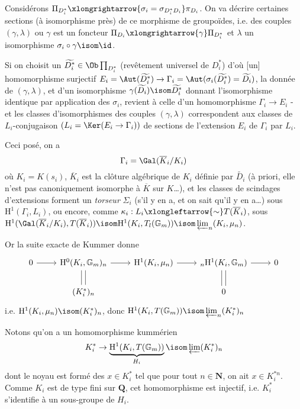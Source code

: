 Considérons $\Pi_{D^*_i} \xlongrightarrow{\sigma_i = \sigma_{D^*_i D_i}} \pi_{D_i}$. On va décrire certaines sections (à isomorphisme près) de ce morphisme de groupoïdes, i.e. des couples $(\gamma, \lambda)$ ou $\gamma$ est un foncteur $\Pi_{D_i} \xlongrightarrow{\gamma} \Pi_{D^*_i}$ et $\lambda$ un isomorphisme $\sigma_i \circ \gamma \isom \id$.

Si on choisit un $\widetilde{D^*_i} \in \Ob \prod_{D^*_i}$ (revêtement universel de $D^*_i$) d'où [un] homomorphisme surjectif $E_i = \Aut(\widetilde{D^*_i}) \to \Gamma_i = \Aut(\sigma_i (\widetilde{D^*_i}) = \widetilde{D_i})$, la donnée de $(\gamma, \lambda)$, et d'un isomorphisme $\gamma(\widetilde{D_i}) \isom \widetilde{D^*_i}$ donnant l'isomorphisme identique par application des $\sigma_i$, revient à celle d'un homomorphisme $\Gamma_i \to E_i$ - et les classes d'isomorphismes des couples $(\gamma, \lambda)$ correspondent aux classes de $L_i$-conjugaison $(L_i = \Ker(E_i \to \Gamma_i))$ de sections de l'extension $E_i$ de $\Gamma_i$ par $L_i$.

Ceci posé, on a 
$$
\Gamma_i = \Gal(\overline{K}_i/K_i)
$$
où $K_i = K(s_i)$, $\overline{K}_i$ est la clôture algébrique de $K_i$ définie par $\widetilde{D_i}$ (à priori, elle n'est pas canoniquement isomorphe à $\overline{K}$ sur $K$\dots), et les classes de scindages d'extensions forment un \emph{torseur} $\Sigma_i$ (s'il y en a, et on sait qu'il y en a\dots) sous $\mathrm{H}^1(\Gamma_i, L_i)$, ou encore, comme $\kappa_i: L_i \xlongleftarrow{\sim} T(\overline{K}_i)$, sous $\mathrm{H}^1(\Gal(\overline{K}_i/K_i), T(\overline{K}_i)) \isom \mathrm{H}^1(K_i, T_l(\mathbb{G}_m)) \isom \varprojlim_n (K_i, \mu_n)$.

Or la suite exacte de Kummer donne
\[\begin{tikzcd}
	0 & {\mathrm{H}^0(K_i, \mathbb{G}_m)_n} & {\mathrm{H}^1(K_i, \mu_n)} & {_n \mathrm{H}^1(K_i, \mathbb{G}_m)} & 0 \\
	& {(K^*_i)_n} && 0
	\arrow[shift left=1, no head, from=1-2, to=2-2]
	\arrow[shift right=1, no head, from=1-2, to=2-2]
	\arrow[shift left=1, no head, from=1-4, to=2-4]
	\arrow[shift right=1, no head, from=1-4, to=2-4]
	\arrow[from=1-2, to=1-3]
	\arrow[from=1-3, to=1-4]
	\arrow[from=1-1, to=1-2]
	\arrow[from=1-4, to=1-5]
\end{tikzcd}\]
i.e. $\mathrm{H}^1(K_i, \mu_n) \isom (K^*_i)_n$, donc $\mathrm{H}^1(K_i, T(\mathbb{G}_m)) \isom \varprojlim_n (K^*_i)_n$

Notons qu'on a un homomorphisme kummérien
$$
K^*_i \to \underbrace{\mathrm{H}^1(K_i, T(\mathbb{G}_m))}_{\hspace*{-5mm}H_i\hspace*{-5mm}} \isom \varprojlim (K^*_i)_n
$$
dont le noyau est formé des $x \in K^*_i$ tel que pour tout $n \in \mathbf{N}$, on ait $x \in K^{*n}_i$. Comme $K_i$ est de type fini sur $\mathbf{Q}$, cet homomorphisme est injectif, i.e. $K^*_i$ s'identifie à un sous-groupe de $H_i$.

